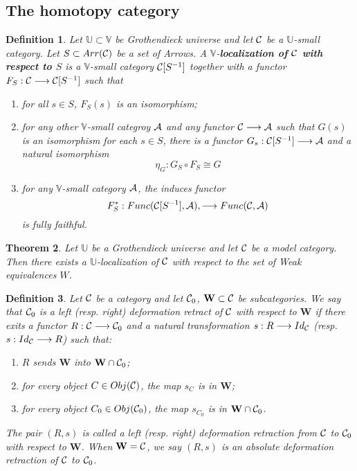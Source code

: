 \documentclass[11pt]{article}
\newtheorem{thm}{Theorem}[section]
\newtheorem{dfn}[thm]{Definition}
\newcommand{\cala}{{\cal A}}
\newcommand{\calc}{{\cal C}}
\newcommand{\lrta}{\longrightarrow}
\begin{document}
\subsection{The homotopy category}

\begin{dfn}
Let $\mathbb{U}\subset\mathbb{V}$ be Grothendieck universe and let $\calc$ be a $\mathbb{U}$-small category. Let $S\subset Arr(\calc)$ be a set of Arrows. A $\mathbb{V}$-\textbf{localization of $\calc$ with respect to $S$} is a $\mathbb{V}$-small category $\calc[S^{-1}]$ together with a functor $F_S:\calc\lrta \calc[S^{-1}]$ such that 
\begin{enumerate}[label=(\roman*)]
\item for all $s\in S$, $F_S(s)$ is an isomorphism;
\item for any other $\mathbb{V}$-small categroy $\cala$ and any functor $\calc\lrta \cala$ such that $G(s)$ is an isomorphism for each $s\in S$, there is a functor $G_s:\calc[S^{-1}]\lrta \cala$ and a natural isomorphism
$$
\eta_G: G_S\circ F_S\cong G
$$
\item for any $\mathbb{V}$-small category $\cala$, the induces functor
$$
F_S^*: Func(\calc[S^{-1}], \cala), \lrta Func(\calc,\cala)
$$
is fully faithful.
\end{enumerate}
\end{dfn}

\begin{thm}
Let $\mathbb{U}$ be a Grothendieck universe and let $\calc$ be a model category. Then there exists a $\mathbb{U}$-localization of $\calc$ with respect to the set of Weak equivalences $W$.
\end{thm}

\begin{dfn}
Let $\calc$ be a category and let $\calc_0$, $\mathbf{W}\subset \calc$ be subcategories. We say that $\calc_0$ is a left (resp. right) deformation retract of $\calc$ with respect to $\mathbf{W}$ if there exits a functor $R:\calc\lrta \calc_0$ and a natural transformation $s: R\lrta Id_\calc$ (resp. $s: Id_\calc\lrta R$) such that:\begin{enumerate}
\item $R$ sends $\mathbf{W}$ into $\mathbf{W}\cap \calc_0$;
\item for every object $C\in Obj(\calc)$, the map $s_C$ is in $\mathbf{W}$;
\item for every object $C_0\in Obj(\calc_0)$, the map $s_{C_0}$ is in $\mathbf{W}\cap \calc_0$.
\end{enumerate}
The pair $(R,s)$ is called a left (resp. right) deformation retraction from $\calc$ to $\calc_0$ with respect to $\mathbf{W}$. When $\mathbf{W}=\calc$, we say  $(R,s)$ is an absolute deformation retraction of $\calc$ to $\calc_0$.
\end{dfn}
\end{document}
